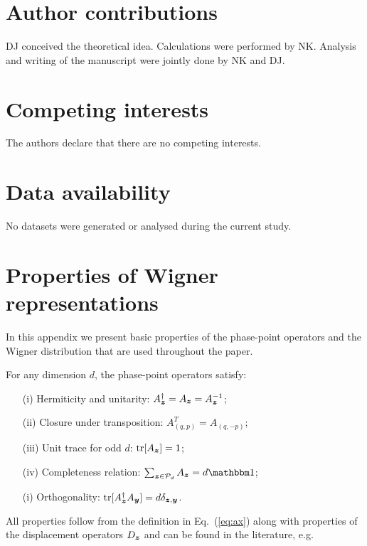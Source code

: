 \documentclass[pra,
aps,
twocolumn,
superscriptaddress,
groupedaddress,
nofootinbib,
reprint
]{revtex4-1}
\begin{document}
\section*{Author contributions}
DJ conceived the theoretical idea. 
Calculations were performed by NK. 
Analysis and writing of the manuscript were jointly done by NK and DJ.

\section*{Competing interests}
The authors declare that there are no competing interests.

\section*{Data availability}
No datasets were generated or analysed during the current study.

\appendix
\newpage
\section{Properties of Wigner representations}
\label{app:wigner}

In this appendix we present basic properties of the phase-point operators and the Wigner distribution that are used throughout the paper.

\begin{proposition}\label{thm:aproperties}
    For any dimension $d$, the phase-point operators satisfy:
    \begin{enumerate}
        \item[(i)]\label{en:a1} Hermiticity and unitarity: $A_{\bm{z}}^\dagger = A_{\bm{z}} = A_{\bm{z}}^{-1}$;
	    \item[(ii)]\label{en:a2} Closure under transposition: $A_{(q, p)}^T = A_{(q, -p)}$;
	    \item[(iii)]\label{en:a3} Unit trace for odd $d$: $\mbox{tr}[A_{\bm{z}}] = 1$;
	    \item[(iv)]\label{en:a4} Completeness relation: $\sum_{\bmz \in \cal{P}_d} A_{\bmz} = d\id$;
	    \item[(i)]\label{en:a5} Orthogonality: $\mbox{tr}[A_{\bm{z}}^\dagger A_{\bm{y}}] = d \delta_{\bm{z},\bm{y}}$.
	\end{enumerate}
\end{proposition}
All properties follow from the definition in Eq.~(\ref{eq:ax}) along with properties of the displacement operators $D_{\bm{z}}$ and can be found in the literature, e.g.~\cite{cit:veitch,Vourdas_2004,cit:gross3}
\end{document}
